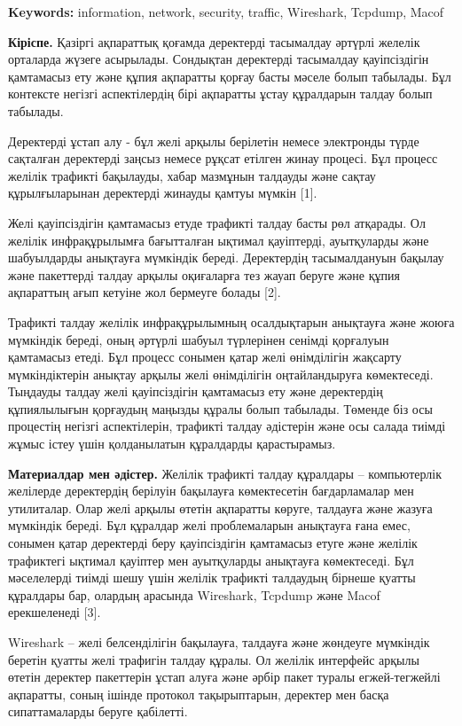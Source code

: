 \textbf{Keywords:} information, network, security, traffic, Wireshark,
Tcpdump, Macof

\textbf{Кіріспе.} Қазіргі ақпараттық қоғамда деректерді тасымалдау
әртүрлі желелік орталарда жүзеге асырылады. Сондықтан деректерді
тасымалдау қауіпсіздігін қамтамасыз ету және құпия ақпаратты қорғау
басты мәселе болып табылады. Бұл контексте негізгі аспектілердің бірі
ақпаратты ұстау құралдарын талдау болып табылады.

Деректерді ұстап алу - бұл желі арқылы берілетін немесе электронды түрде
сақталған деректерді заңсыз немесе рұқсат етілген жинау процесі. Бұл
процесс желілік трафикті бақылауды, хабар мазмұнын талдауды және сақтау
құрылғыларынан деректерді жинауды қамтуы мүмкін {[}1{]}.

Желі қауіпсіздігін қамтамасыз етуде трафикті талдау басты рөл атқарады.
Ол желілік инфрақұрылымға бағытталған ықтимал қауіптерді, ауытқуларды
және шабуылдарды анықтауға мүмкіндік береді. Деректердің тасымалдануын
бақылау және пакеттерді талдау арқылы оқиғаларға тез жауап беруге және
құпия ақпараттың ағып кетуіне жол бермеуге болады {[}2{]}.

Трафикті талдау желілік инфрақұрылымның осалдықтарын анықтауға және
жоюға мүмкіндік береді, оның әртүрлі шабуыл түрлерінен сенімді қорғалуын
қамтамасыз етеді. Бұл процесс сонымен қатар желі өнімділігін жақсарту
мүмкіндіктерін анықтау арқылы желі өнімділігін оңтайландыруға
көмектеседі. Тыңдауды талдау желі қауіпсіздігін қамтамасыз ету және
деректердің құпиялылығын қорғаудың маңызды құралы болып табылады.
Төменде біз осы процестің негізгі аспектілерін, трафикті талдау
әдістерін және осы салада тиімді жұмыс істеу үшін қолданылатын
құралдарды қарастырамыз.

\textbf{Материалдар мен әдістер.} Желілік трафикті талдау құралдары --
компьютерлік желілерде деректердің берілуін бақылауға көмектесетін
бағдарламалар мен утилиталар. Олар желі арқылы өтетін ақпаратты көруге,
талдауға және жазуға мүмкіндік береді. Бұл құралдар желі проблемаларын
анықтауға ғана емес, сонымен қатар деректерді беру қауіпсіздігін
қамтамасыз етуге және желілік трафиктегі ықтимал қауіптер мен
ауытқуларды анықтауға көмектеседі. Бұл мәселелерді тиімді шешу үшін
желілік трафикті талдаудың бірнеше қуатты құралдары бар, олардың
арасында Wireshark, Tcpdump және Macof ерекшеленеді {[}3{]}.

Wireshark -- желі белсенділігін бақылауға, талдауға және жөндеуге
мүмкіндік беретін қуатты желі трафигін талдау құралы. Ол желілік
интерфейс арқылы өтетін деректер пакеттерін ұстап алуға және әрбір пакет
туралы егжей-тегжейлі ақпаратты, соның ішінде протокол тақырыптарын,
деректер мен басқа сипаттамаларды беруге қабілетті.

